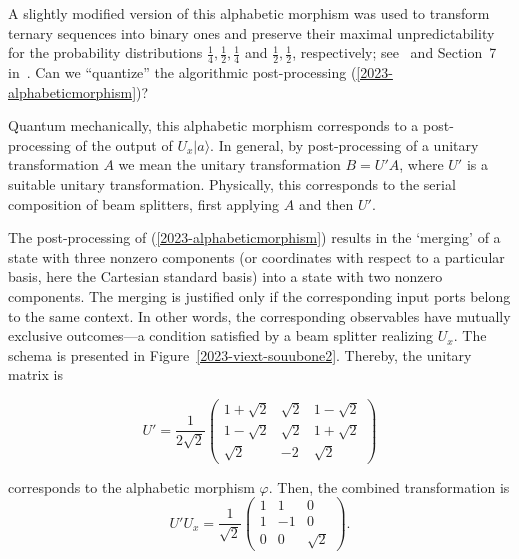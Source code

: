 \documentclass[%
 reprint,
 superscriptaddress,
 showpacs,
 showkeys,
 nofootinbib,
  amsmath,amssymb,
 pra,
  longbibliography,
  floatfix,
 ]{revtex4-2}
\theoremstyle{definition}
\begin{document}
  A slightly modified version of this alphabetic morphism
 was used to
 transform ternary sequences into binary ones and preserve their maximal unpredictability
 for the probability distributions  $\frac{1}{4},\frac{1}{2},\frac{1}{4}$ and $\frac{1}{2},\frac{1}{2}$, respectively;
see~\cite{CALUDE202131} and Section~7 in~\cite{aguero_trejo_new_2021}. Can we ``quantize'' the algorithmic post-processing (\ref{2023-alphabeticmorphism})?




Quantum mechanically, this alphabetic morphism corresponds to a post-processing of the output of $U_x\vert a \rangle$.
In general, by
post-processing of a  unitary transformation $A$ we mean the unitary transformation $B = U'A$, where $U'$ is a suitable unitary transformation.
Physically, this corresponds to the serial composition of beam splitters, first applying $A$ and then $U'$.

The post-processing of (\ref{2023-alphabeticmorphism}) results in the `merging'
of a state with three nonzero components
(or coordinates with respect to a particular basis, here the Cartesian standard basis)
into a state with two
nonzero components. The merging is justified only if the corresponding input ports belong to the same context.
In other words, the corresponding observables have mutually exclusive outcomes---a condition satisfied by a beam splitter realizing $U_x$.
The schema is presented in Figure~\ref{2023-viext-souubone2}.
Thereby,  the unitary matrix is

\begin{equation}
U' =\frac{1}{2\sqrt2}
\begin{pmatrix}
1+\sqrt2& \sqrt2 & 1-\sqrt2\\
1-\sqrt2 & \sqrt2 & 1+\sqrt2 \\
\sqrt2 & -2 & \sqrt2
\end{pmatrix}
\label{2023-viext-upux}
\end{equation}

\noindent corresponds to the alphabetic morphism $\varphi$.
Then, the combined transformation is
\begin{equation}
U'U_x =
\frac{1}{\sqrt{2}}
\begin{pmatrix}
1&1&0\\
1&-1&0\\
0&0&\sqrt{2}
\end{pmatrix}
.
\label{2023-viext-u}
\end{equation}
\end{document}

